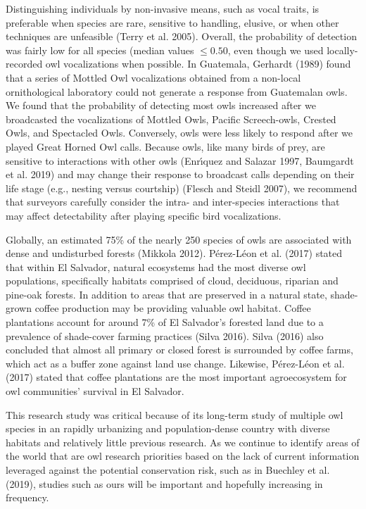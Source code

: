 \documentclass[
]{article}
\begin{document}
Distinguishing individuals by non-invasive means, such as vocal traits,
is preferable when species are rare, sensitive to handling, elusive, or
when other techniques are unfeasible (Terry et al. 2005). Overall, the
probability of detection was fairly low for all species (median values
\(\le 0.50\), even though we used locally-recorded owl vocalizations
when possible. In Guatemala, Gerhardt (1989) found that a series of
Mottled Owl vocalizations obtained from a non-local ornithological
laboratory could not generate a response from Guatemalan owls. We found
that the probability of detecting most owls increased after we
broadcasted the vocalizations of Mottled Owls, Pacific Screech-owls,
Crested Owls, and Spectacled Owls. Conversely, owls were less likely to
respond after we played Great Horned Owl calls. Because owls, like many
birds of prey, are sensitive to interactions with other owls (Enrı́quez
and Salazar 1997, Baumgardt et al. 2019) and may change their response
to broadcast calls depending on their life stage (e.g., nesting versus
courtship) (Flesch and Steidl 2007), we recommend that surveyors
carefully consider the intra- and inter-species interactions that may
affect detectability after playing specific bird vocalizations.

Globally, an estimated 75\% of the nearly 250 species of owls are
associated with dense and undisturbed forests (Mikkola 2012). Pérez-Léon
et al. (2017) stated that within El Salvador, natural ecosystems had the
most diverse owl populations, specifically habitats comprised of cloud,
deciduous, riparian and pine-oak forests. In addition to areas that are
preserved in a natural state, shade-grown coffee production may be
providing valuable owl habitat. Coffee plantations account for around
7\% of El Salvador's forested land due to a prevalence of shade-cover
farming practices (Silva 2016). Silva (2016) also concluded that almost
all primary or closed forest is surrounded by coffee farms, which act as
a buffer zone against land use change. Likewise, Pérez-Léon et al.
(2017) stated that coffee plantations are the most important
agroecosystem for owl communities' survival in El Salvador.

This research study was critical because of its long-term study of
multiple owl species in an rapidly urbanizing and population-dense
country with diverse habitats and relatively little previous research.
As we continue to identify areas of the world that are owl research
priorities based on the lack of current information leveraged against
the potential conservation risk, such as in Buechley et al. (2019),
studies such as ours will be important and hopefully increasing in
frequency.
\end{document}
